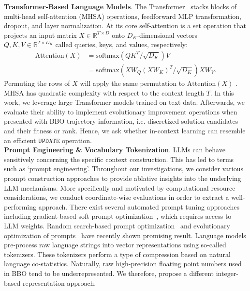 \documentclass[sigconf]{acmart}
\begin{document}
\textbf{Transformer-Based Language Models}. The Transformer~\cite{vaswani2017attention} stacks blocks of multi-head self-attention (MHSA) operations, feedforward MLP transformation, dropout, and layer normalization.  At its core self-attention is a set operation that projects an input matrix $X \in \mathbb{R}^{T \times D}$ onto $D_K$-dimensional vectors $Q, K, V \in \mathbb{R}^{T \times D_K}$ called queries, keys, and values, respectively:
\vspace{-0.25cm}
\begin{align*}
    \mathrm{Attention}(X) &= \mathrm{softmax}\left(QK^T/\sqrt{D_K}\right) V \\
    &= \mathrm{softmax}\left(X W_Q \left(X W_K\right)^T/\sqrt{D_K}\right) X W_V.
\end{align*}
Permuting the rows of $X$ will apply the same permutation to $\text{Attention}(X)$ \cite[e.g., ][]{lee2019set, tang2021sensory, kossen2021self}. MHSA has quadratic complexity with respect to the context length $T$. In this work, we leverage large Transformer models trained on text data. Afterwards, we evaluate their ability to implement evolutionary improvement operations when presented with BBO trajectory information, i.e. discretized solution candidates and their fitness or rank. Hence, we ask whether in-context learning can resemble an efficient $\texttt{UPDATE}$ operation.\\
\textbf{Prompt Engineering \& Vocabulary Tokenization}. LLMs can behave sensitively concerning the specific context construction. This has led to terms such as `prompt engineering'. Throughout our investigations, we consider various prompt construction approaches to provide ablative insights into the underlying LLM mechanisms. More specifically and motivated by computational resource considerations, we conduct coordinate-wise evaluations in order to extract a well-performing approach.
There exist several automated prompt tuning approaches including gradient-based soft prompt optimization~\cite{lester2021power}, which requires access to LLM weights. Random search-based prompt optimization~\cite{lu2023prompt}
and evolutionary optimization of prompts~\cite{li2023spell, guo2023connecting, fernando2023promptbreeder} have recently shown promising result.
Language models pre-process raw language strings into vector representations using so-called tokenizers. These tokenizers perform a type of compression based on natural language co-statistics. Naturally, raw high-precision floating point numbers used in BBO tend to be underrepresented. We therefore, propose a different integer-based representation approach.
\end{document}
